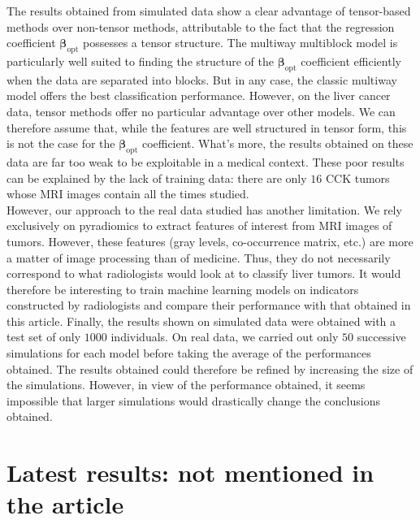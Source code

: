 \documentclass[preprint,12pt]{elsarticle}
\begin{document}
The results obtained from simulated data show a clear advantage of tensor-based methods over non-tensor methods, attributable to the fact that the regression coefficient $\bm{\beta}_{\text{opt}}$ possesses a tensor structure. The multiway multiblock model is particularly well suited to finding the structure of the $\bm{\beta}_{\text{opt}}$ coefficient efficiently when the data are separated into blocks. But in any case, the classic multiway model offers the best classification performance. However, on the liver cancer data, tensor methods offer no particular advantage over other models. We can therefore assume that, while the features are well structured in tensor form, this is not the case for the $\bm{\beta}_\text{opt}$ coefficient. What's more, the results obtained on these data are far too weak to be exploitable in a medical context. These poor results can be explained by the lack of training data: there are only $16$ CCK tumors whose MRI images contain all the times studied.\\
\indent However, our approach to the real data studied has another limitation. We rely exclusively on pyradiomics to extract features of interest from MRI images of tumors. However, these features (gray levels, co-occurrence matrix, etc.) are more a matter of image processing than of medicine. Thus, they do not necessarily correspond to what radiologists would look at to classify liver tumors. It would therefore be interesting to train machine learning models on indicators constructed by radiologists and compare their performance with that obtained in this article. Finally, the results shown on simulated data were obtained with a test set of only $1000$ individuals. On real data, we carried out only $50$ successive simulations for each model before taking the average of the performances obtained. The results obtained could therefore be refined by increasing the size of the simulations. However, in view of the performance obtained, it seems impossible that larger simulations would drastically change the conclusions obtained.

\newpage

\section{Latest results: not mentioned in the article}
\end{document}

